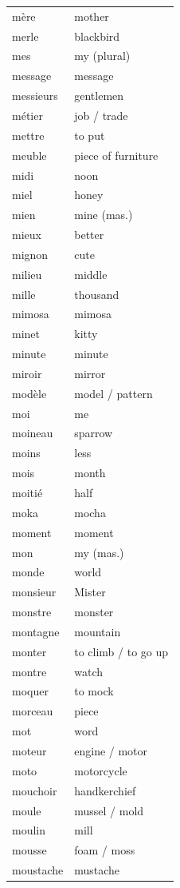 \documentclass[12pt,a4paper]{article}
\begin{document}
\begin{longtable}{p{4cm} p{6cm}}
mère & mother \\
merle & blackbird \\
mes & my (plural) \\
message & message \\
messieurs & gentlemen \\
métier & job / trade \\
mettre & to put \\
meuble & piece of furniture \\
midi & noon \\
miel & honey \\
mien & mine (mas.) \\
mieux & better \\
mignon & cute \\
milieu & middle \\
mille & thousand \\
mimosa & mimosa \\
minet & kitty \\
minute & minute \\
miroir & mirror \\
modèle & model / pattern \\
moi & me \\
moineau & sparrow \\
moins & less \\
mois & month \\
moitié & half \\
moka & mocha \\
moment & moment \\
mon & my (mas.) \\
monde & world \\
monsieur & Mister \\
monstre & monster \\
montagne & mountain \\
monter & to climb / to go up \\
montre & watch \\
moquer & to mock \\
morceau & piece \\
mot & word \\
moteur & engine / motor \\
moto & motorcycle \\
mouchoir & handkerchief \\
moule & mussel / mold \\
moulin & mill \\
mousse & foam / moss \\
moustache & mustache \\

\end{longtable}
\end{document}
